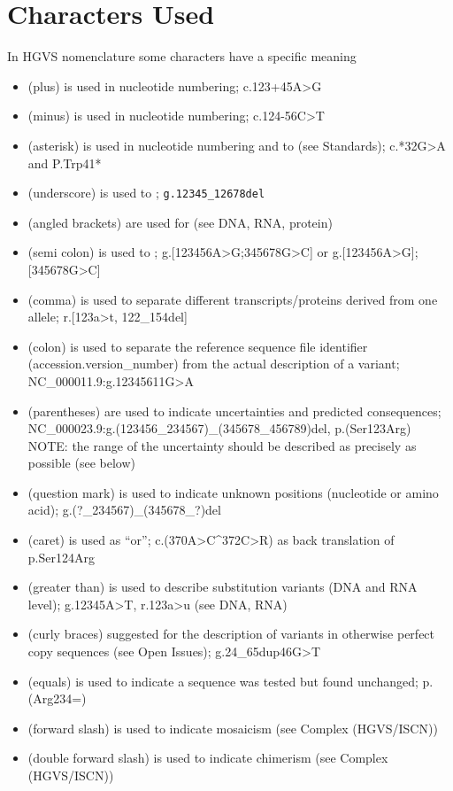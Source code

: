\section{Characters Used}

In HGVS nomenclature some characters have a specific meaning
\begin{itemize}
	\item \myDoubleQuoteEnglish{+} (plus) is used in nucleotide numbering; c.123+45A>G
	\item \myDoubleQuoteEnglish{-} (minus) is used in nucleotide numbering; c.124-56C>T
	\item \myDoubleQuoteEnglish{*} (asterisk) is used in nucleotide numbering and to  (see Standards); c.*32G>A and P.Trp41*
	\item \myDoubleQuoteEnglish{\_} (underscore) is used to ; \verb|g.12345_12678del|
	\item \myDoubleQuoteEnglish{[ ]} (angled brackets) are used for  (see DNA, RNA, protein) 
	\item \myDoubleQuoteEnglish{;} (semi colon) is used to ; g.[123456A>G;345678G>C] or g.[123456A>G];[345678G>C]
	\item \myDoubleQuoteEnglish{,} (comma) is used to separate different transcripts/proteins derived from one allele; r.[123a>t, 122_154del]
	\item \myDoubleQuoteEnglish{:} (colon) is used to separate the reference sequence file identifier (accession.version_number) from the actual description of a variant; NC_000011.9:g.12345611G>A
	\item \myDoubleQuoteEnglish{( )} (parentheses) are used to indicate uncertainties and predicted consequences; NC_000023.9:g.(123456_234567)_(345678_456789)del, p.(Ser123Arg)
	NOTE: the range of the uncertainty should be described as precisely as possible (see below)
	\item {} (question mark) is used to indicate unknown positions (nucleotide or amino acid); g.(?_234567)_(345678_?)del
	\item \myDoubleQuoteEnglish{^} (caret) is used as “or”; c.(370A>C^372C>R) as back translation of p.Ser124Arg
	\item \myDoubleQuoteEnglish{>} (greater than) is used to describe substitution variants (DNA and RNA level); g.12345A>T, r.123a>u (see DNA, RNA)
	\item \myDoubleQuoteEnglish{{ }} (curly braces) suggested for the description of variants in otherwise perfect copy sequences (see Open Issues); g.24_65dup{46G>T}
	\item \myDoubleQuoteEnglish{=} (equals) is used to indicate a sequence was tested but found unchanged; p.(Arg234=)
	\item \myDoubleQuoteEnglish{/} (forward slash) is used to indicate mosaicism (see Complex (HGVS/ISCN))
	\item \myDoubleQuoteEnglish{//} (double forward slash) is used to indicate chimerism (see Complex (HGVS/ISCN))
\end{itemize}